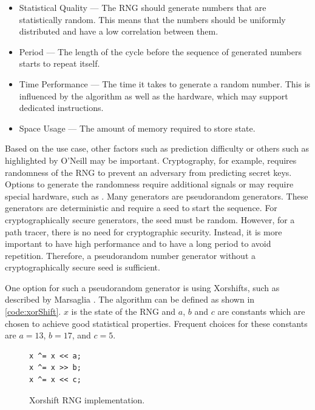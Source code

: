 \begin{itemize}
  \item{Statistical Quality} — The \gls{RNG} should generate numbers that are statistically random. This means that the numbers should be uniformly distributed and have a low correlation between them.
  \item{Period} — The length of the cycle before the sequence of generated numbers starts to repeat itself.
  \item{Time Performance} — The time it takes to generate a random number. This is influenced by the algorithm as well as the hardware, which may support dedicated instructions.
  \item{Space Usage} — The amount of memory required to store state.
\end{itemize}

Based on the use case, other factors such as prediction difficulty or others such as highlighted by O’Neill \cite{o2014pcg} may be important. Cryptography, for example, requires randomness of the \gls{RNG} to prevent an adversary from predicting secret keys. Options to generate the randomness require additional signals \cite{randomnessCryptography} or may require special hardware, such as  \cite{cloudflareLavaRand}. Many generators are pseudorandom generators. These generators are deterministic and require a seed to start the sequence. For cryptographically secure generators, the seed must be random.
However, for a path tracer, there is no need for cryptographic security. Instead, it is more important to have high performance and to have a long period to avoid repetition. Therefore, a pseudorandom number generator without a cryptographically secure seed is sufficient.

One option for such a pseudorandom generator is using Xorshifts, such as described by Marsaglia \cite{marsaglia2003xorshift}. The algorithm can be defined as shown in \autoref{code:xorShift}. $x$ is the state of the \gls{RNG} and $a$, $b$ and $c$ are constants which are chosen to achieve good statistical properties. Frequent choices for these constants are $a = 13$, $b = 17$, and $c = 5$.

\begin{figure}[H]
  \begin{lstlisting}[style=wgsl]
x ^= x << a;
x ^= x >> b;
x ^= x << c;
\end{lstlisting}
  \caption{Xorshift \gls{RNG} implementation.}
  \label{code:xorShift}
\end{figure}

